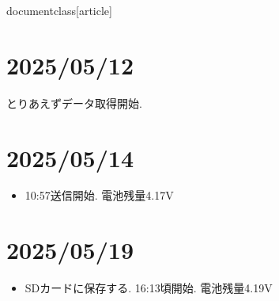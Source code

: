 documentclass[article]



\section{2025/05/12}
とりあえずデータ取得開始.


\section{2025/05/14}
\begin{itemize}
    \item 10:57送信開始. 電池残量4.17V
\end{itemize}

\section{2025/05/19}
\begin{itemize}
    \item SDカードに保存する. 16:13頃開始. 電池残量4.19V
\end{itemize}




